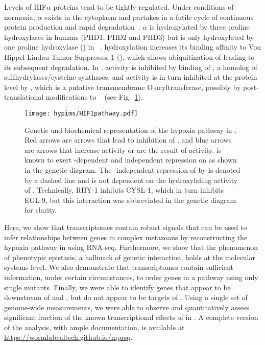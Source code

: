 Levels of HIF$\alpha$ proteins tend to be tightly regulated. Under conditions of
normoxia, \hifp{}$\alpha$ exists in the cytoplasm and partakes in a futile cycle
of continuous protein production and rapid degradation~\citep{Huang1996}.
\hifp{}$\alpha$ is hydroxylated by three proline hydroxylases
in humans (PHD1, PHD2 and PHD3) but is only hydroxylated by one proline
hydroxylase (\eglp{}) in \cel{}~\citep{Kaelin2008}. \hifp{} hydroxylation
increases its binding affinity to Von Hippel Lindau Tumor Suppressor 1
(\vhlp{}), which allows ubiquitination of \hifp{} leading to its subsequent
degradation. In \cel{}, \eglp{} activity is inhibited by binding of \cyslp{}, a
homolog of sulfhydrylases/cysteine synthases,
and \cyslp{} activity is in turn inhibited at the protein level by \rhyp{},
which is a putative transmembrane O-acyltransferase,
possibly by post-translational modifications to \cyslp{}~\citep{Ma2012} (see
Fig.~\ref{fig:pathway}).

\begin{figure}[tbhp]
\centering
\texttt{[image: hypims/HIF1pathway.pdf]}
\caption{
Genetic and biochemical representation of the hypoxia pathway in \cel{}.
Red arrows are arrows that lead to inhibition of \hifp{}, and blue arrows
are arrows that increase \hifp{} activity or are the result of \hifp{} activity.
\eglp{} is known to exert -dependent and independent repression
on \hifp{} as shown in the genetic diagram. The -independent
repression of \hifp{} by \eglp{} is denoted by a dashed line and is not dependent
on the hydroxylating activity of \eglp{}.
Technically, RHY-1 inhibits CYSL-1, which in turn inhibits EGL-9, but this
interaction was abbreviated in the genetic diagram for clarity.
}
\label{fig:pathway}
\end{figure}

Here, we show that transcriptomes contain robust signals that can be
used to infer relationships between genes in complex metazoans by reconstructing
the hypoxia pathway in \cel{} using RNA-seq.
Furthermore, we show that the phenomenon of phenotypic epistasis, a hallmark of
genetic interaction, holds at the molecular systems level.
We also demonstrate that transcriptomes contain sufficient information, under
certain circumstances, to order genes in a pathway using only single mutants.
Finally, we were able to identify genes that appear to be downstream of 
and , but do not appear to be targets of .
Using a single set of genome-wide measurements, we were able to observe and
quantitatively assess  significant fraction of the known transcriptional
effects of  in \cel{}.
A complete version of the analysis, with ample documentation, is available at
\url{https://wormlabcaltech.github.io/mprsq}.

